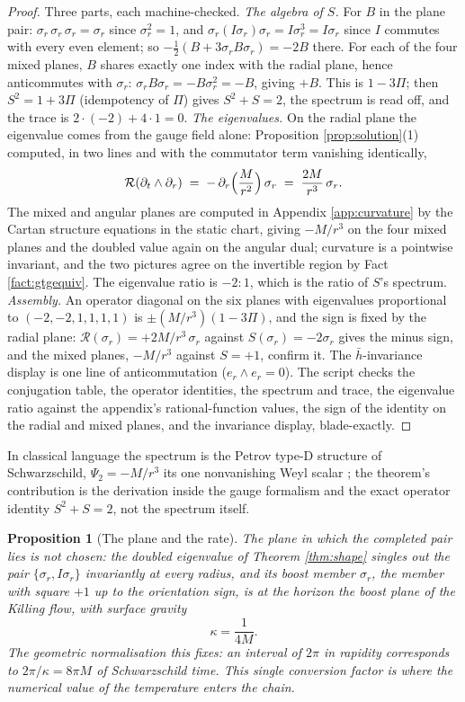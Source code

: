 \documentclass[11pt]{article}
\newtheorem{proposition}[theorem]{Proposition}
\theoremstyle{definition}
\newcommand{\hb}{\bar{h}}
\newcommand{\er}{e_r}
\begin{document}
\begin{proof}
Three parts, each machine-checked. \emph{The algebra of $S$.} For $B$ in the plane pair: $\sigma_r\,\sigma_r\,\sigma_r = \sigma_r$ since $\sigma_r^2 = 1$, and $\sigma_r (I\sigma_r)\sigma_r = I\sigma_r^3 = I\sigma_r$ since $I$ commutes with every even element; so $-\tfrac12(B + 3\sigma_r B\sigma_r) = -2B$ there. For each of the four mixed planes, $B$ shares exactly one index with the radial plane, hence anticommutes with $\sigma_r$: $\sigma_r B \sigma_r = -B\sigma_r^2 = -B$, giving $+B$. This is $1 - 3\Pi$; then $S^2 = 1 + 3\Pi$ (idempotency of $\Pi$) gives $S^2 + S = 2$, the spectrum is read off, and the trace is $2\cdot(-2) + 4\cdot 1 = 0$. \emph{The eigenvalues.} On the radial plane the eigenvalue comes from the gauge field alone: Proposition \ref{prop:solution}(1) computed, in two lines and with the commutator term vanishing identically,
\[
\mathcal{R}(\partial_t \wedge \partial_r) \;=\; -\,\partial_r\Bigl(\frac{M}{r^2}\Bigr)\,\sigma_r \;=\; \frac{2M}{r^3}\,\sigma_r .
\]
The mixed and angular planes are computed in Appendix \ref{app:curvature} by the Cartan structure equations in the static chart, giving $-M/r^3$ on the four mixed planes and the doubled value again on the angular dual; curvature is a pointwise invariant, and the two pictures agree on the invertible region by Fact \ref{fact:gtgequiv}. The eigenvalue ratio is $-2 : 1$, which is the ratio of $S$'s spectrum. \emph{Assembly.} An operator diagonal on the six planes with eigenvalues proportional to $(-2,-2,1,1,1,1)$ is $\pm(M/r^3)(1 - 3\Pi)$, and the sign is fixed by the radial plane: $\mathcal{R}(\sigma_r) = +2M/r^{3}\,\sigma_r$ against $S(\sigma_r) = -2\sigma_r$ gives the minus sign, and the mixed planes, $-M/r^{3}$ against $S = +1$, confirm it. The $\hb$-invariance display is one line of anticommutation ($\er \wedge \er = 0$). The script checks the conjugation table, the operator identities, the spectrum and trace, the eigenvalue ratio against the appendix's rational-function values, the sign of the identity on the radial and mixed planes, and the invariance display, blade-exactly.
\end{proof}

In classical language the spectrum is the Petrov type-D structure of Schwarzschild, $\Psi_2 = -M/r^{3}$ its one nonvanishing Weyl scalar \cite{Chandrasekhar1983}; the theorem's contribution is the derivation inside the gauge formalism and the exact operator identity $S^{2} + S = 2$, not the spectrum itself.

\begin{proposition}[The plane and the rate]\label{prop:plane}
The plane in which the completed pair lies is not chosen: the doubled eigenvalue of Theorem \ref{thm:shape} singles out the pair $\{\sigma_r, I\sigma_r\}$ invariantly at every radius, and its boost member $\sigma_r$, the member with square $+1$ up to the orientation sign, is at the horizon the boost plane of the Killing flow, with surface gravity
\[
\kappa = \frac{1}{4M} .
\]
The geometric normalisation this fixes: an interval of $2\pi$ in rapidity corresponds to $2\pi/\kappa = 8\pi M$ of Schwarzschild time. This single conversion factor is where the numerical value of the temperature enters the chain.
\end{proposition}
\end{document}

